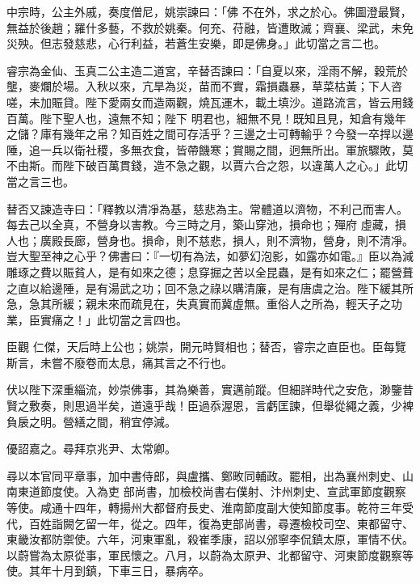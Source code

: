 \begin{pinyinscope}
 中宗時，公主外戚，奏度僧尼，姚崇諫曰：「佛
 不在外，求之於心。佛圖澄最賢，無益於後趙；羅什多藝，不救於姚秦。何充、苻融，皆遭敗滅；齊襄、梁武，未免災殃。但志發慈悲，心行利益，若蒼生安樂，即是佛身。」此切當之言二也。



 睿宗為金仙、玉真二公主造二道宮，辛替否諫曰：「自夏以來，淫雨不解，穀荒於壟，麥爛於場。入秋以來，亢旱為災，苗而不實，霜損蟲暴，草菜枯黃；下人咨嗟，未加賑貸。陛下愛兩女而造兩觀，燒瓦運木，載土填沙。道路流言，皆云用錢百萬。陛下聖人也，遠無不知；陛下
 明君也，細無不見！既知且見，知倉有幾年之儲？庫有幾年之帛？知百姓之間可存活乎？三邊之士可轉輸乎？今發一卒捍以邊陲，追一兵以衛社稷，多無衣食，皆帶饑寒；賞賜之間，迥無所出。軍旅驟敗，莫不由斯。而陛下破百萬貫錢，造不急之觀，以賈六合之怨，以違萬人之心。」此切當之言三也。



 替否又諫造寺曰：「釋教以清凈為基，慈悲為主。常體道以濟物，不利己而害人。每去己以全真，不營身以害教。今三時之月，築山穿池，損命也；殫府
 虛藏，損人也；廣殿長廊，營身也。損命，則不慈悲，損人，則不濟物，營身，則不清凈。豈大聖至神之心乎？佛書曰：『一切有為法，如夢幻泡影，如露亦如電。』臣以為減雕琢之費以賑貧人，是有如來之德；息穿掘之苦以全昆蟲，是有如來之仁；罷營葺之直以給邊陲，是有湯武之功；回不急之祿以購清廉，是有唐虞之治。陛下緩其所急，急其所緩；親未來而疏見在，失真實而冀虛無。重俗人之所為，輕天子之功業，臣實痛之！」此切當之言四也。



 臣觀
 仁傑，天后時上公也；姚崇，開元時賢相也；替否，睿宗之直臣也。臣每覽斯言，未嘗不廢卷而太息，痛其言之不行也。



 伏以陛下深重緇流，妙崇佛事，其為樂善，實邁前蹤。但細詳時代之安危，渺鑒昔賢之敷奏，則思過半矣，道遠乎哉！臣過忝渥恩，言虧匡諫，但舉從繩之義，少裨負扆之明。營繕之間，稍宜停減。



 優詔嘉之。尋拜京兆尹、太常卿。



 尋以本官同平章事，加中書侍郎，與盧攜、鄭畋同輔政。罷相，出為襄州刺史、山南東道節度使。入為吏
 部尚書，加檢校尚書右僕射、汴州刺史、宣武軍節度觀察等使。咸通十四年，轉揚州大都督府長史、淮南節度副大使知節度事。乾符三年受代，百姓詣闕乞留一年，從之。四年，復為吏部尚書，尋遷檢校司空、東都留守、東畿汝都防禦使。六年，河東軍亂，殺崔季康，詔以邠寧李侃鎮太原，軍情不伏。以蔚嘗為太原從事，軍民懷之。八月，以蔚為太原尹、北都留守、河東節度觀察等使。其年十月到鎮，下車三日，暴病卒。




\end{pinyinscope}
